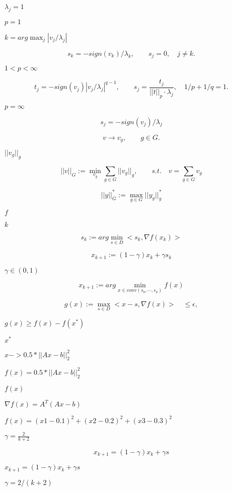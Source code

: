\documentclass{article}
\begin{document}
$ \lambda_j = 1 $
\pagebreak

$ p=1 $
\pagebreak

$ k = arg\max_j |v_j/\lambda_j|$
\pagebreak

\[ s_k = -sign(v_k)/\lambda_k, \qquad s_j = 0, \quad j\neq k. \]
\pagebreak

$ 1<p<\infty $
\pagebreak

\[ t_j = -sign(v_j) |v_j/\lambda_j|^{q-1}, \qquad s_j = \frac{t_j}{||t||_p\cdot\lambda_j}, \quad 1/p + 1/q = 1. \]
\pagebreak

$ p=\infty $
\pagebreak

\[ s_j = -sign(v_j)/\lambda_j \]
\pagebreak

\[ v \rightarrow v_g, \qquad g\in G. \]
\pagebreak

$ || v_g ||_g $
\pagebreak

\[ ||v||_G := \min_{v_g} \sum_{g\in G} ||v_g||_g, \qquad s.t. \quad v = \sum_{g\in G} v_g \]
\pagebreak

\[ ||y||^*_G := \max_{g\in G} ||y_g||_g^* \]
\pagebreak

$ f $
\pagebreak

$ k $
\pagebreak

\[ s_k:= arg\min_{s\in D} <s_k, \nabla f(x_k)> \]
\pagebreak

\[ x_{k+1} := (1-\gamma) x_k + \gamma s_k \]
\pagebreak

$ \gamma \in (0, 1) $
\pagebreak

\[ x_{k+1}:= arg\min_{x\in conv(s_0, \cdots, s_k)} f(x) \]
\pagebreak

\[ g(x):= \max_{s\in D} <x-s, \nabla f(x)> \quad \leq \epsilon, \]
\pagebreak

$ g(x) \geq f(x) - f(x^*) $
\pagebreak

$ x^* $
\pagebreak

$ x-> 0.5 * || Ax - b ||_2^2 $
\pagebreak

$ f(x) = 0.5 * ||Ax - b||_2^2 $
\pagebreak

$ f(x) $
\pagebreak

$ \nabla f(x) = A^T(Ax - b) $
\pagebreak

$ f(x) = (x1 - 0.1)^2 + (x2 - 0.2)^2 + (x3 - 0.3)^2 $
\pagebreak

$ \gamma = \frac{2}{k+2} $
\pagebreak

\[ x_{k+1} = (1-\gamma) x_k + \gamma s \]
\pagebreak

$ x_{k+1} = (1-\gamma)x_k + \gamma s $
\pagebreak

$ \gamma = 2/(k+2) $
\pagebreak
\end{document}

